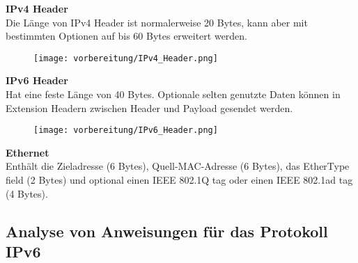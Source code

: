     \textbf{IPv4 Header}
    \\
    Die Länge von IPv4 Header ist normalerweise 20 Bytes, kann aber mit bestimmten Optionen auf bis 60 Bytes erweitert werden.\\

    \begin{figure}[H]
        \centering
        \texttt{[image: vorbereitung/IPv4\_Header.png]}
    \end{figure}

    \textbf{IPv6 Header}
    \\
    Hat eine feste Länge von 40 Bytes. Optionale selten genutzte Daten können in Extension Headern zwischen Header und Payload gesendet werden.\\

    \begin{figure}[H]
        \centering
        \texttt{[image: vorbereitung/IPv6\_Header.png]}
    \end{figure}
    \pagebreak
    \textbf{Ethernet}
    \\
    Enthält die Zieladresse (6 Bytes), Quell-MAC-Adresse (6 Bytes), das EtherType field (2 Bytes) und optional einen IEEE 802.1Q tag oder einen IEEE 802.1ad tag (4 Bytes).

\subsection{Analyse von Anweisungen für das Protokoll IPv6}
    